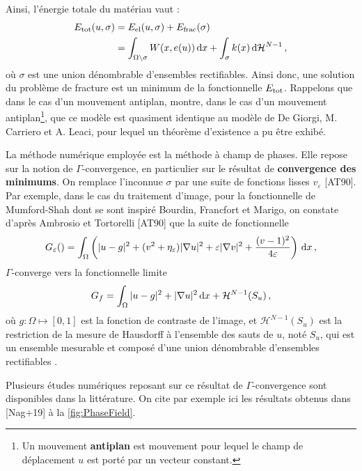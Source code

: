 Ainsi, l’énergie totale du matériau vaut :
\begin{align*}
\etot(u,\sigma) &= \eel(u,\sigma) + \efrac(\sigma) \\
&= \int_{\Omega \backslash \sigma} W(x,e(u)) \diff x + \int_{\sigma} k(x) \diff \mathcal{H}^{N-1} \,,
\end{align*}
où $\sigma$ est une union dénombrable d'ensembles rectifiables. Ainsi donc, une solution du problème de fracture est un minimum de la fonctionnelle $E_{\text{tot}}$. Rappelons que dans le cas d'un mouvement antiplan, \citeauthor{balasoiu2020thesis} montre, dans le cas d'un mouvement antiplan\footnote{Un mouvement \textbf{antiplan} est mouvement pour lequel le champ de déplacement $u$ est porté par un vecteur constant.}, que ce modèle est quasiment identique au modèle de De Giorgi, M. Carriero et A. Leaci, pour lequel un théorème d'existence a pu être exhibé.

La méthode numérique employée est la méthode à champ de phases. Elle repose sur la notion de $\Gamma$-convergence, en particulier sur le résultat de \textbf{convergence des minimums}. On remplace l'inconnue $\sigma$ par une suite de fonctions lisses $v_\varepsilon$ [AT90]. Par exemple, dans le cas du traitement d'image, pour la fonctionnelle de Mumford-Shah dont se sont inspiré Bourdin, Francfort et Marigo, on constate d'après Ambrosio et Tortorelli [AT90] que la suite de fonctionnelle
$$
G_{\varepsilon}() = \int_{\Omega} \left( \vert u-g \vert^2 + (v^2 + \eta_{\varepsilon}) \vert \nabla u \vert^2 + \varepsilon \vert \nabla v \vert^2 + \frac{(v-1)^2}{4\varepsilon} \right) \diff x \,,
$$
$\Gamma$-converge vers la fonctionnelle limite 
$$
G_f = \int_{\Omega} \vert u-g \vert^2 + \vert \nabla u \vert^2 \diff x + \mathcal{H}^{N-1}(S_u) \,,
$$
où $g:\Omega \mapsto [0,1]$ est la fonction de contraste de l’image, et $\mathcal{H}^{N-1}(S_u)$ est la restriction de la mesure de Hausdorff à l’ensemble des sauts de $u$, noté $S_u$, qui est un ensemble mesurable et composé d’une union dénombrable d’ensembles rectifiables \parencite[pp.33-35]{balasoiu2020thesis}.

Plusieurs études numériques reposant sur ce résultat de $\Gamma$-convergence sont disponibles dans la littérature. On cite par exemple ici les résultats obtenus dans [Nag+19] à la \cref{fig:PhaseField}.

